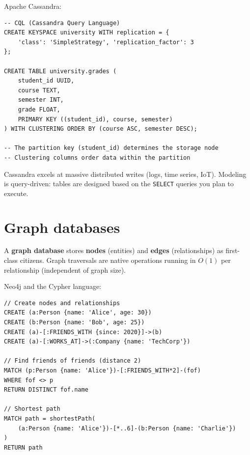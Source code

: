\begin{example}
Apache Cassandra:
\begin{verbatim}
-- CQL (Cassandra Query Language)
CREATE KEYSPACE university WITH replication = {
    'class': 'SimpleStrategy', 'replication_factor': 3
};

CREATE TABLE university.grades (
    student_id UUID,
    course TEXT,
    semester INT,
    grade FLOAT,
    PRIMARY KEY ((student_id), course, semester)
) WITH CLUSTERING ORDER BY (course ASC, semester DESC);

-- The partition key (student_id) determines the storage node
-- Clustering columns order data within the partition
\end{verbatim}
\end{example}

\begin{remark}
Cassandra excels at massive distributed writes (logs, time series, IoT).
Modeling is query-driven: tables are designed based on the \texttt{SELECT}
queries you plan to execute.
\end{remark}

\section{Graph databases}

\begin{definition}
A \textbf{graph database} stores \textbf{nodes} (entities) and
\textbf{edges} (relationships) as first-class citizens. Graph traversals
are native operations running in $O(1)$ per relationship (independent of
graph size).
\end{definition}

\begin{example}
Neo4j and the Cypher language:
\begin{verbatim}
// Create nodes and relationships
CREATE (a:Person {name: 'Alice', age: 30})
CREATE (b:Person {name: 'Bob', age: 25})
CREATE (a)-[:FRIENDS_WITH {since: 2020}]->(b)
CREATE (a)-[:WORKS_AT]->(:Company {name: 'TechCorp'})

// Find friends of friends (distance 2)
MATCH (p:Person {name: 'Alice'})-[:FRIENDS_WITH*2]-(fof)
WHERE fof <> p
RETURN DISTINCT fof.name

// Shortest path
MATCH path = shortestPath(
    (a:Person {name: 'Alice'})-[*..6]-(b:Person {name: 'Charlie'})
)
RETURN path
\end{verbatim}
\end{example}

